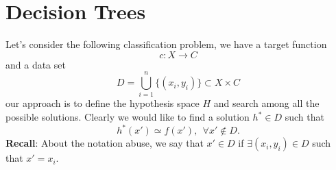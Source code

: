 \documentclass[10pt, letterpaper]{report}
\begin{document}
\chapter{Decision Trees}
Let's consider the following classification problem, we have a target function\begin{equation}
	c:X\rightarrow C
\end{equation}
and a data set \begin{equation}
	D=\bigcup_{i=1}^n\{(x_i,y_i)\}\subset X\times C
\end{equation}
our approach is to define the hypothesis space $H$ and search among all the possible solutions. Clearly we would like to find a solution $h^*\in D$ such that\begin{equation}
	h^*(x')\simeq f(x'), \ \ \forall x'\notin D.
\end{equation}
\textbf{Recall}: About the notation abuse, we say that $x'\in D$ if $\exists (x_i,y_i)\in D $ such that $x'=x_i$.\bigskip
\end{document}
